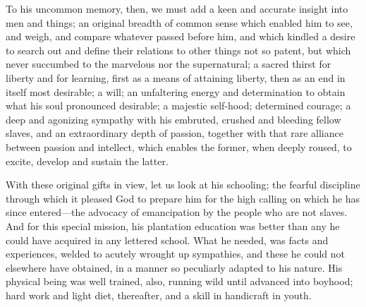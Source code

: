 To his uncommon memory, then, we must add a keen and accurate insight
into men and things; an original breadth of common sense which enabled
him to see, and weigh, and compare whatever passed before him, and which
kindled a desire to search out and define their relations to other
things not so patent, but which never
{\protect\hypertarget{xix}{}{}}succumbed to the marvelous nor the
supernatural; a sacred thirst for liberty and for learning, first as a
means of attaining liberty, then as an end in itself most desirable; a
will; an unfaltering energy and determination to obtain what his soul
pronounced desirable; a majestic self-hood; determined courage; a deep
and agonizing sympathy with his embruted, crushed and bleeding fellow
slaves, and an extraordinary depth of passion, together with that rare
alliance between passion and intellect, which enables the former, when
deeply roused, to excite, develop and sustain the latter.

With these original gifts in view, let us look at his schooling; the
fearful discipline through which it pleased God to prepare him for the
high calling on which he has since entered---the advocacy of
emancipation by the people who are not slaves. And for this special
mission, his plantation education was better than any he could have
acquired in any lettered school. What he needed, was facts and
experiences, welded to acutely wrought up sympathies, and these he could
not elsewhere have obtained, in a manner so peculiarly adapted to his
nature. His physical being was well trained, also, running wild until
advanced into boyhood; hard work and light diet, thereafter, and a skill
in handicraft in youth.

